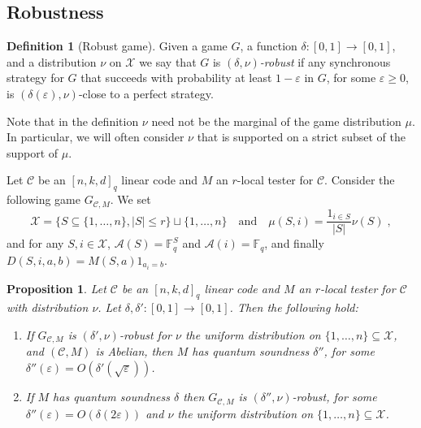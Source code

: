 \documentclass[11pt]{article}
\newtheorem{proposition}[theorem]{Proposition}
\theoremstyle{definition}
\newtheorem{definition}[theorem]{Definition}
\newcommand{\code}{\mathcal{C}}
\newcommand{\F}{\ensuremath{\mathbb{F}}}
\newcommand{\mA}{\ensuremath{\mathcal{A}}}
\newcommand{\mC}{\ensuremath{\mathcal{C}}}
\newcommand{\mX}{\ensuremath{\mathcal{X}}}
\newcommand{\eps}{\varepsilon}
\begin{document}
\subsection{Robustness}


\begin{definition}[Robust game]
Given a game $G$, a function $\delta:[0,1]\to[0,1]$, and a distribution $\nu$ on $\mX$ we say that $G$ is \emph{$(\delta,\nu)$-robust} if any synchronous strategy for $G$ that succeeds with probability at least $1-\eps$ in $G$, for some $\eps\geq 0$, is
 $(\delta(\eps),\nu)$-close to a perfect strategy.
\end{definition}

Note that in the definition $\nu$ need not be the marginal of the game distribution $\mu$. In particular, we will often consider $\nu$ that is supported on a strict subset of the support of $\mu$. 

Let $\code$ be an $[n,k,d]_q$ linear code and $M$ an $r$-local tester for $\code$. Consider the following game $G_{\code,M}$. We set 
\[\mX = \{ S\subseteq \{1,\ldots,n\},|S|\leq r\} \sqcup\{1,\ldots,n\}\quad\text{and}\quad \mu(S,i)=\frac{1_{i\in S}}{|S|}\nu(S)\;,\]
and for any $S,i\in\mX$, $\mA(S)=\F_q^S$ and $\mA(i)=\F_q$, and finally $D(S,i,a,b)=M(S,a)1_{a_i=b}$. 



\begin{proposition}\label{prop:sound-game}
Let $\code$ be an $[n,k,d]_q$ linear code and $M$ an $r$-local tester for $\code$ with distribution $\nu$. Let $\delta,\delta':[0,1]\to[0,1]$. Then the following hold:
\begin{enumerate}
\item If $G_{\code,M}$ is $(\delta',\nu)$-robust for $\nu$ the uniform distribution on $\{1,\ldots,n\}\subseteq \mX$, and $(\mC,M)$ is Abelian, then $M$ has quantum soundness $\delta''$, for some $\delta''(\eps) = O(\delta'(\sqrt{\eps}))$. 
\item If $M$ has quantum soundness $\delta$ then $G_{\code,M}$ is $(\delta'',\nu)$-robust, for some $\delta''(\eps)=O({\delta(2\eps)})$ and $\nu$ the uniform distribution on $\{1,\ldots,n\}\subseteq \mX$. 
\end{enumerate}
\end{proposition}
\end{document}
